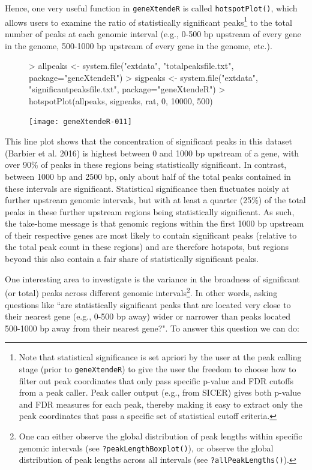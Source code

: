 \documentclass[12pt]{article}
\begin{document}
Hence, one very useful function in \texttt{geneXtendeR} is called \texttt{hotspotPlot()}, which allows users to examine the ratio of statistically significant peaks\footnote{Note that statistical significance is set apriori by the user at the peak calling stage (prior to \texttt{geneXtendeR}) to give the user the freedom to choose how to filter out peak coordinates that only pass specific p-value and FDR cutoffs from a peak caller.  Peak caller output (e.g., from SICER) gives both p-value and FDR measures for each peak, thereby making it easy to extract only the peak coordinates that pass a specific set of statistical cutoff criteria.} to the total number of peaks at each genomic interval (e.g., 0-500 bp upstream of every gene in the genome, 500-1000 bp upstream of every gene in the genome, etc.). 

\begin{figure}[H]
\begin{center}
\begin{Schunk}
\begin{Sinput}
> allpeaks <- system.file("extdata", "totalpeaksfile.txt", package="geneXtendeR")
> sigpeaks <- system.file("extdata", "significantpeaksfile.txt", package="geneXtendeR")
> hotspotPlot(allpeaks, sigpeaks, rat, 0, 10000, 500)
\end{Sinput}
\end{Schunk}
\texttt{[image: geneXtendeR-011]}
\end{center}
\end{figure}

This line plot shows that the concentration of significant peaks in this dataset (Barbier et al. 2016) is highest between 0 and 1000 bp upstream of a gene, with over 90\% of peaks in these regions being statistically significant.  In contrast, between 1000 bp and 2500 bp, only about half of the total peaks contained in these intervals are significant.  Statistical significance then fluctuates noisly at further upstream genomic intervals, but with at least a quarter (25\%) of the total peaks in these further upstream regions being statistically significant.  As such, the take-home message is that genomic regions within the first 1000 bp upstream of their respective genes are most likely to contain significant peaks (relative to the total peak count in these regions) and are therefore hotspots, but regions beyond this also contain a fair share of statistically significant peaks.

One interesting area to investigate is the variance in the broadness of significant (or total) peaks across different genomic intervals\footnote{One can either observe the global distribution of peak lengths within specific genomic intervals (see \texttt{?peakLengthBoxplot()}), or observe the global distribution of peak lengths across all intervals (see \texttt{?allPeakLengths()}).}.  In other words, asking questions like ``are statistically significant peaks that are located very close to their nearest gene (e.g., 0-500 bp away) wider or narrower than peaks located 500-1000 bp away from their nearest gene?".  To answer this question we can do:
\end{document}
